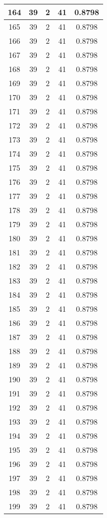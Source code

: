 \documentclass[letterpaper, 12pt]{article}
\begin{document}
\begin{longtable}{|c|c|c|c|c|}
\hline
164 & 39 & 2 & 41 & 0.8798 \\
\hline
165 & 39 & 2 & 41 & 0.8798 \\
\hline
166 & 39 & 2 & 41 & 0.8798 \\
\hline
167 & 39 & 2 & 41 & 0.8798 \\
\hline
168 & 39 & 2 & 41 & 0.8798 \\
\hline
169 & 39 & 2 & 41 & 0.8798 \\
\hline
170 & 39 & 2 & 41 & 0.8798 \\
\hline
171 & 39 & 2 & 41 & 0.8798 \\
\hline
172 & 39 & 2 & 41 & 0.8798 \\
\hline
173 & 39 & 2 & 41 & 0.8798 \\
\hline
174 & 39 & 2 & 41 & 0.8798 \\
\hline
175 & 39 & 2 & 41 & 0.8798 \\
\hline
176 & 39 & 2 & 41 & 0.8798 \\
\hline
177 & 39 & 2 & 41 & 0.8798 \\
\hline
178 & 39 & 2 & 41 & 0.8798 \\
\hline
179 & 39 & 2 & 41 & 0.8798 \\
\hline
180 & 39 & 2 & 41 & 0.8798 \\
\hline
181 & 39 & 2 & 41 & 0.8798 \\
\hline
182 & 39 & 2 & 41 & 0.8798 \\
\hline
183 & 39 & 2 & 41 & 0.8798 \\
\hline
184 & 39 & 2 & 41 & 0.8798 \\
\hline
185 & 39 & 2 & 41 & 0.8798 \\
\hline
186 & 39 & 2 & 41 & 0.8798 \\
\hline
187 & 39 & 2 & 41 & 0.8798 \\
\hline
188 & 39 & 2 & 41 & 0.8798 \\
\hline
189 & 39 & 2 & 41 & 0.8798 \\
\hline
190 & 39 & 2 & 41 & 0.8798 \\
\hline
191 & 39 & 2 & 41 & 0.8798 \\
\hline
192 & 39 & 2 & 41 & 0.8798 \\
\hline
193 & 39 & 2 & 41 & 0.8798 \\
\hline
194 & 39 & 2 & 41 & 0.8798 \\
\hline
195 & 39 & 2 & 41 & 0.8798 \\
\hline
196 & 39 & 2 & 41 & 0.8798 \\
\hline
197 & 39 & 2 & 41 & 0.8798 \\
\hline
198 & 39 & 2 & 41 & 0.8798 \\
\hline
199 & 39 & 2 & 41 & 0.8798 \\
\hline
\end{longtable}
\end{document}
